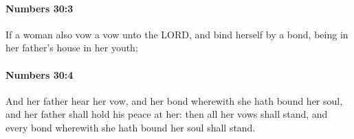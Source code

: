 		\paragraph{Numbers 30:3} %
			\label{NUMBERS-30-3}

			If a woman also vow a vow unto the LORD, and bind herself by a bond, being in her father’s house in her youth;


		\paragraph{Numbers 30:4} %
			\label{NUMBERS-30-4}

			And her father hear her vow, and her bond wherewith she hath bound her soul, and her father shall hold his peace at her: then all her vows shall stand, and every bond wherewith she hath bound her soul shall stand.



